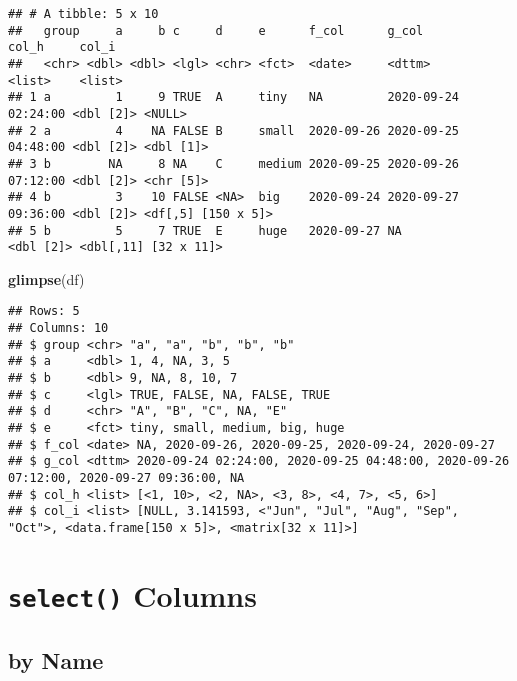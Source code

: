 \documentclass[
]{book}
\newenvironment{Shaded}{\begin{snugshade}}{\end{snugshade}}
\newcommand{\KeywordTok}[1]{\textcolor[rgb]{0.13,0.29,0.53}{\textbf{#1}}}
\newcommand{\NormalTok}[1]{#1}
\newcommand{\OperatorTok}[1]{\textcolor[rgb]{0.81,0.36,0.00}{\textbf{#1}}}
\newcommand{\StringTok}[1]{\textcolor[rgb]{0.31,0.60,0.02}{#1}}
\begin{document}
\begin{verbatim}
## # A tibble: 5 x 10
##   group     a     b c     d     e      f_col      g_col               col_h     col_i               
##   <chr> <dbl> <dbl> <lgl> <chr> <fct>  <date>     <dttm>              <list>    <list>              
## 1 a         1     9 TRUE  A     tiny   NA         2020-09-24 02:24:00 <dbl [2]> <NULL>              
## 2 a         4    NA FALSE B     small  2020-09-26 2020-09-25 04:48:00 <dbl [2]> <dbl [1]>           
## 3 b        NA     8 NA    C     medium 2020-09-25 2020-09-26 07:12:00 <dbl [2]> <chr [5]>           
## 4 b         3    10 FALSE <NA>  big    2020-09-24 2020-09-27 09:36:00 <dbl [2]> <df[,5] [150 x 5]>  
## 5 b         5     7 TRUE  E     huge   2020-09-27 NA                  <dbl [2]> <dbl[,11] [32 x 11]>
\end{verbatim}

\begin{Shaded}
\begin{Highlighting}[]
\KeywordTok{glimpse}\NormalTok{(df)}
\end{Highlighting}
\end{Shaded}

\begin{verbatim}
## Rows: 5
## Columns: 10
## $ group <chr> "a", "a", "b", "b", "b"
## $ a     <dbl> 1, 4, NA, 3, 5
## $ b     <dbl> 9, NA, 8, 10, 7
## $ c     <lgl> TRUE, FALSE, NA, FALSE, TRUE
## $ d     <chr> "A", "B", "C", NA, "E"
## $ e     <fct> tiny, small, medium, big, huge
## $ f_col <date> NA, 2020-09-26, 2020-09-25, 2020-09-24, 2020-09-27
## $ g_col <dttm> 2020-09-24 02:24:00, 2020-09-25 04:48:00, 2020-09-26 07:12:00, 2020-09-27 09:36:00, NA
## $ col_h <list> [<1, 10>, <2, NA>, <3, 8>, <4, 7>, <5, 6>]
## $ col_i <list> [NULL, 3.141593, <"Jun", "Jul", "Aug", "Sep", "Oct">, <data.frame[150 x 5]>, <matrix[32 x 11]>]
\end{verbatim}

\hypertarget{select-columns}{%
\section{\texorpdfstring{\texttt{select()} Columns}{select() Columns}}\label{select-columns}}

\hypertarget{by-name}{%
\subsection{by Name}\label{by-name}}

\begin{Shaded}
\end{Shaded}
\end{document}
